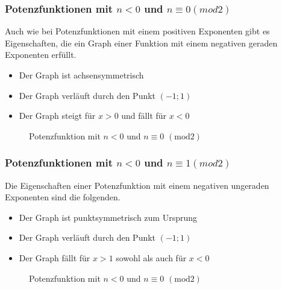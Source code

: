 \subsubsection{Potenzfunktionen mit $n<0$ und $n\equiv0(mod2)$}
Auch wie bei Potenzfunktionen mit einem positiven Exponenten gibt es Eigenschaften, die ein Graph einer Funktion mit einem negativen geraden Exponenten erfüllt.
\begin{itemize}
	\item Der Graph ist achsensymmetrisch
	\item Der Graph verläuft durch den Punkt $(-1;1)$
	\item Der Graph steigt für $x>0$ und fällt für $x<0$
\end{itemize}
\begin{figure}[h!]
\centering
{}
\caption{Potenzfunktion mit $n<0$ und $ n\equiv0$ $(\mathrm{mod}2)$}
\end{figure}
\subsubsection{Potenzfunktionen mit $n<0$ und $n\equiv1(mod2)$}
Die Eigenschaften einer Potenzfunktion mit einem negativen ungeraden Exponenten sind die folgenden. 
\begin{itemize}
	\item Der Graph ist punktsymmetrisch zum Ursprung
	\item Der Graph verläuft durch den Punkt $(-1;1)$
	\item Der Graph fällt für $x>1$ sowohl als auch für $x<0$
\end{itemize}
\begin{figure}[h!]
\centering
{}
\caption{Potenzfunktion mit $n<0$ und $ n\equiv0$ $(\mathrm{mod}2)$}
\end{figure}
